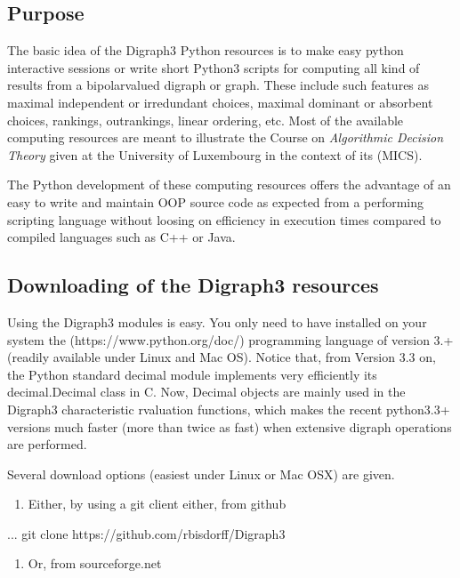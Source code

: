 \documentclass[a4paper,10pt,english]{sphinxhowto}
\begin{document}
\subsection{Purpose}
\label{\detokenize{tutorial:purpose}}
The basic idea of the Digraph3 Python resources is to make easy python interactive sessions or write short Python3 scripts for computing all kind of results from a bipolar\sphinxhyphen{}valued digraph or graph. These include such features as maximal independent or irredundant choices, maximal dominant or absorbent choices, rankings, outrankings, linear ordering, etc. Most of the available computing resources are meant to illustrate the  Course on \emph{Algorithmic Decision Theory} given at the University of Luxembourg in the context of its  (MICS).

The Python development of these computing resources offers the advantage of an easy to write and maintain OOP source code as expected from a performing scripting language without loosing on efficiency in execution times compared to compiled languages such as C++ or Java.


\subsection{Downloading of the Digraph3 resources}
\label{\detokenize{tutorial:downloading-of-the-digraph3-resources}}
Using the Digraph3 modules is easy. You only need to have installed on your system the  (https://www.python.org/doc/) programming language of version 3.+ (readily available under Linux and Mac OS). Notice that, from Version 3.3 on, the Python standard decimal module implements very efficiently its decimal.Decimal class in C. Now, Decimal objects are mainly used in the Digraph3 characteristic r\sphinxhyphen{}valuation functions, which makes the recent python\sphinxhyphen{}3.3+ versions much faster (more than twice as fast) when extensive digraph operations are performed.

Several download options (easiest under Linux or Mac OS\sphinxhyphen{}X) are given.
\begin{enumerate}
%
\item {} 
Either, by using a git client either, from github

\end{enumerate}

\begin{sphinxVerbatim}[commandchars=\\\{\}]
...\PYGZdl{} git clone https://github.com/rbisdorff/Digraph3
\end{sphinxVerbatim}
\begin{enumerate}
%
\setcounter{enumi}{1}
\item {} 
Or, from sourceforge.net

\end{enumerate}
\end{document}
